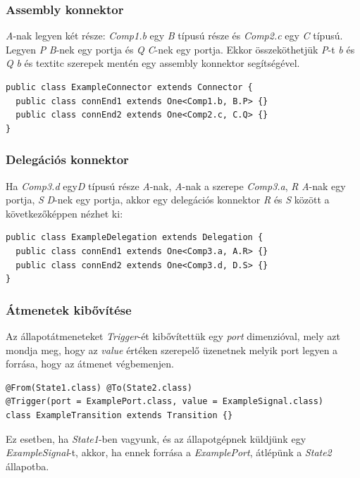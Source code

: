 \documentclass[a4paper,12pt]{report}
\begin{document}
\subsubsection{Assembly konnektor}

\textit{A}-nak legyen két része: \textit{Comp1.b} egy \textit{B} típusú része és \textit{Comp2.c} egy \textit{C} típusú. Legyen \textit{P} \textit{B}-nek egy portja és \textit{Q} \textit{C}-nek egy portja. Ekkor összeköthetjük \textit{P}-t \textit{b} és \textit{Q} \textit{b} és textit{c} szerepek mentén egy assembly konnektor segítségével. 

\begin{lstlisting}
public class ExampleConnector extends Connector {
  public class connEnd1 extends One<Comp1.b, B.P> {}
  public class connEnd2 extends One<Comp2.c, C.Q> {}
}
\end{lstlisting}

\subsubsection{Delegációs konnektor}
Ha \textit{Comp3.d} egy\textit{D} típusú része \textit{A}-nak, \textit{A}-nak a szerepe \textit{Comp3.a}, \textit{R} \textit{A}-nak egy portja, \textit{S} \textit{D}-nek egy portja, akkor egy delegációs konnektor \textit{R} és \textit{S} között a következőképpen nézhet ki:
\begin{lstlisting}
public class ExampleDelegation extends Delegation {
  public class connEnd1 extends One<Comp3.a, A.R> {}
  public class connEnd2 extends One<Comp3.d, D.S> {}
}
\end{lstlisting}

\subsubsection{Átmenetek kibővítése}
Az állapotátmeneteket \textit{Trigger}-ét kibővítettük egy \textit{port} dimenzióval, mely azt mondja meg, hogy az \textit{value} értéken szerepelő üzenetnek melyik port legyen a forrása, hogy az átmenet végbemenjen.
\begin{lstlisting}
@From(State1.class) @To(State2.class)
@Trigger(port = ExamplePort.class, value = ExampleSignal.class)
class ExampleTransition extends Transition {}
\end{lstlisting}

Ez esetben, ha \textit{State1}-ben vagyunk, és az állapotgépnek küldjünk egy  \textit{ExampleSignal}-t, akkor, ha ennek forrása a \textit{ExamplePort}, átlépünk a \textit{State2} állapotba.
\end{document}
